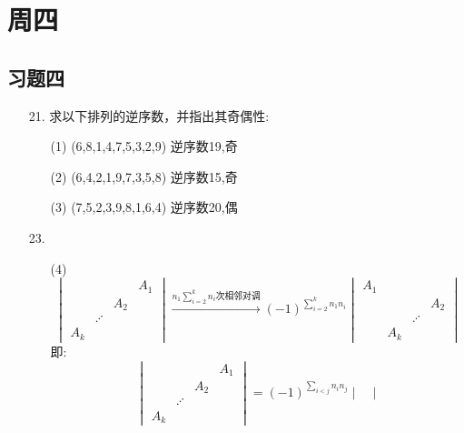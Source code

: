 \documentclass{article}
\begin{document}
\section{周四}
\subsection{习题四}
\begin{enumerate}
    \item [21.]求以下排列的逆序数，并指出其奇偶性:
    \begin{enumerate}
        \item [(1)] (6,8,1,4,7,5,3,2,9) \quad 逆序数19,奇
        \item [(2)] (6,4,2,1,9,7,3,5,8) \quad 逆序数15,奇
        \item [(3)] (7,5,2,3,9,8,1,6,4) \quad 逆序数20,偶
    \end{enumerate}
    \item [23.]
    \begin{enumerate}
        \item [(4)]
        \[
            \begin{vmatrix}
                    &         &     & A_1\\
                    &         & A_2 &    \\
                    & \iddots &          \\
                A_k &         &     &     
            \end{vmatrix}
            \xrightarrow{n_1\sum\limits_{i=2}^{k}n_i\mbox{次相邻对调}}
            {(-1)}^{\sum\limits_{i=2}^{k}n_1n_i}
            \begin{vmatrix}
                A_1 &     &         &     \\
                    &     &         & A_2 \\
                    &     & \iddots &     \\
                    & A_k &         &     
            \end{vmatrix}
        \]
        即:
        \[
            \begin{vmatrix}
                &         &     & A_1\\
                &         & A_2 &    \\
                & \iddots &          \\
            A_k &         &     &     
            \end{vmatrix}
            =
            {(-1)}^{\sum\limits_{i<j} n_i n_j}
            \begin{vmatrix}

\end{vmatrix}\]
\end{enumerate}
\end{enumerate}
\end{document}
